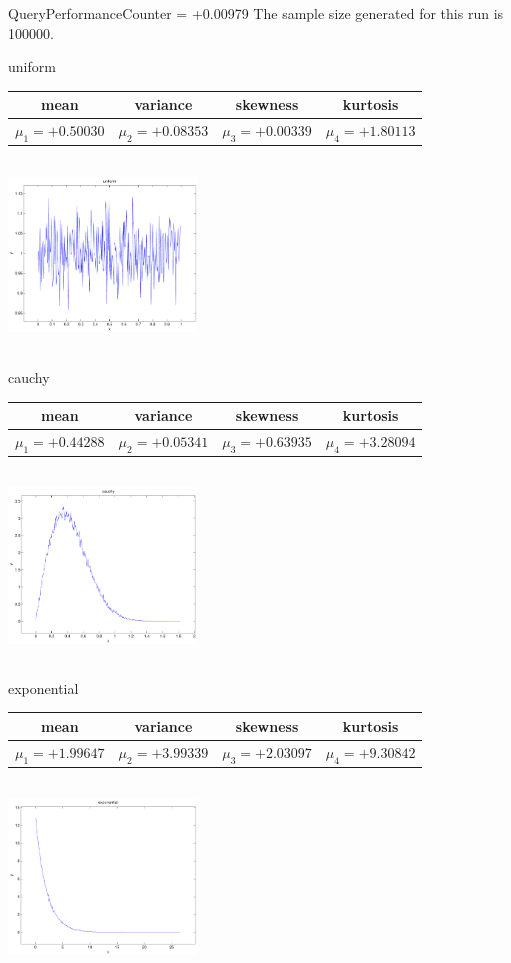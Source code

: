 \documentclass[9pt]{article}
\theoremstyle{plain}
\theoremstyle{definition}
\theoremstyle{remark}
\numberwithin{equation}{section}
\begin{document}
QueryPerformanceCounter  =  +0.00979
The sample size generated for this run is 100000.

\newpage
uniform \begin{tabular}{|c|c|c|c|}  mean & variance & skewness & kurtosis \\  \hline
$\mu_1 = +0.50030$ & $\mu_2 = +0.08353$ & $\mu_3 = +0.00339$ & $\mu_4 =+1.80113$ \\
\end{tabular}

\includegraphics[width=5cm,height=5cm]{uniform.pdf}

cauchy \begin{tabular}{|c|c|c|c|}  mean & variance & skewness & kurtosis \\  \hline
$\mu_1 = +0.44288$ & $\mu_2 = +0.05341$ & $\mu_3 = +0.63935$ & $\mu_4 =+3.28094$ \\
\end{tabular}

\includegraphics[width=5cm,height=5cm]{cauchy.pdf}

exponential \begin{tabular}{|c|c|c|c|}  mean & variance & skewness & kurtosis \\  \hline
$\mu_1 = +1.99647$ & $\mu_2 = +3.99339$ & $\mu_3 = +2.03097$ & $\mu_4 =+9.30842$ \\
\end{tabular}

\includegraphics[width=5cm,height=5cm]{exponential.pdf}
\end{document}
